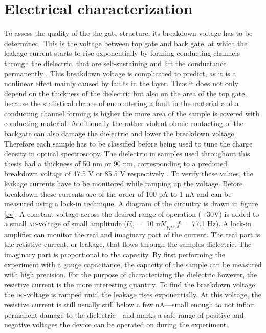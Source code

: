 \section{Electrical characterization}

To assess the quality of the the gate structure, its breakdown voltage has to be determined. This is the voltage between top gate and back gate, at which the leakage current starts to rise exponentially by forming conducting channels through the dielectric, that are self-sustaining and lift the conductance permanently \cite{klein_maximum_1966}. This breakdown voltage is complicated to predict, as it is a nonlinear effect mainly caused by faults in the \sio layer. Thus it does not only depend on the thickness of the dielectric but also on the area of the top gate, because the statistical chance of encountering a fault in the material and a conducting channel forming is higher the more area of the sample is covered with conducting material. Additionally the rather violent ohmic contacting of the backgate can also damage the dielectric and lower the breakdown voltage. Therefore each sample has to be classified before being used to tune the charge density in optical spectroscopy. The dielectric in samples used throughout this thesis had a thickness of 50 nm or 90 nm, corresponding to a predicted breakdown voltage of 47.5 V or 85.5 V respectively \cite{klein_maximum_1966}. To verify these values, the leakage currents have to be monitored while ramping up the voltage. Before breakdown these currents are of the order of 100 pA to 1 nA and can be measured using a lock-in technique. A diagram of the circuitry is drawn in figure \ref{cv}. A constant voltage across the desired range of operation ({\small$\pm $}30V) is added to a small \textsc{ac}-voltage of small amplitude ($U_0 = $ 10 mV$_{pp}$, $f = $ 77.1 Hz). A lock-in amplifier can monitor the real and imaginary part of the current. The real part is the resistive current, or leakage, that flows through the samples dielectric. The imaginary part is proportional to the capacity. By first performing the experiment with a gauge capacitance, the capacity of the sample can be measured with high precision. For the purpose of characterizing the dielectric however, the resistive current is the more interesting quantity. To find the breakdown voltage the \textsc{dc}-voltage is ramped until the leakage rises exponentially. At this voltage, the resistive current is still usually still below a few nA---small enough to not inflict permanent damage to the dielectric---and marks a safe range of positive and negative voltages the device can be operated on during the experiment.

